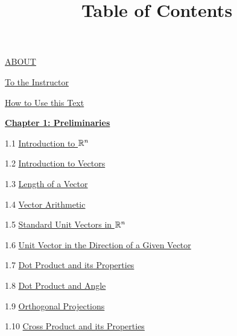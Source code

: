 \documentclass{ximera}
\title{Table of Contents} \license{CC BY-NC-SA 4.0}
\begin{document}
\begin{abstract}
\end{abstract}
\maketitle
	
\href{https://ximera.osu.edu/linearalgebradzv3/LinearAlgebraInteractiveIntro/ABOUT/main}{ABOUT}
	
\href{https://ximera.osu.edu/linearalgebradzv3/LinearAlgebraInteractiveIntro/toInstructor/main}{To the Instructor}
	
\href{https://ximera.osu.edu/linearalgebradzv3/LinearAlgebraInteractiveIntro/HowToUse/main}{How to Use this Text}
	
\href{https://ximera.osu.edu/linearalgebradzv3/LinearAlgebraInteractiveIntro/XLAChapter_prelim/main}{\textbf{Chapter 1: Preliminaries}}
	
1.1	\href{https://ximera.osu.edu/linearalgebradzv3/LinearAlgebraInteractiveIntro/RRN-0010/main}{Introduction to $\mathbb{R}^n$}
	
1.2	\href{https://ximera.osu.edu/linearalgebradzv3/LinearAlgebraInteractiveIntro/VEC-0010/main}{Introduction to Vectors}
	
1.3	\href{https://ximera.osu.edu/linearalgebradzv3/LinearAlgebraInteractiveIntro/VEC-0020/main}{Length of a Vector}
	
1.4	\href{https://ximera.osu.edu/linearalgebradzv3/LinearAlgebraInteractiveIntro/VEC-0030/main}{Vector Arithmetic}
	
1.5	\href{https://ximera.osu.edu/linearalgebradzv3/LinearAlgebraInteractiveIntro/VEC-0035/main}{Standard Unit Vectors in $\mathbb{R}^n$}
	
1.6	\href{https://ximera.osu.edu/linearalgebradzv3/LinearAlgebraInteractiveIntro/VEC-0036/main}{Unit Vector in the Direction of a Given Vector}
	
1.7	\href{https://ximera.osu.edu/linearalgebradzv3/LinearAlgebraInteractiveIntro/VEC-0050/main}{Dot Product and its Properties}
	
1.8	\href{https://ximera.osu.edu/linearalgebradzv3/LinearAlgebraInteractiveIntro/VEC-0060/main}{Dot Product and Angle }
	
1.9	\href{https://ximera.osu.edu/linearalgebradzv3/LinearAlgebraInteractiveIntro/VEC-0070/main}{Orthogonal Projections}
	
1.10	\href{https://ximera.osu.edu/linearalgebradzv3/LinearAlgebraInteractiveIntro/VEC-0080/main}{Cross Product and its Properties}
	
\end{document}
